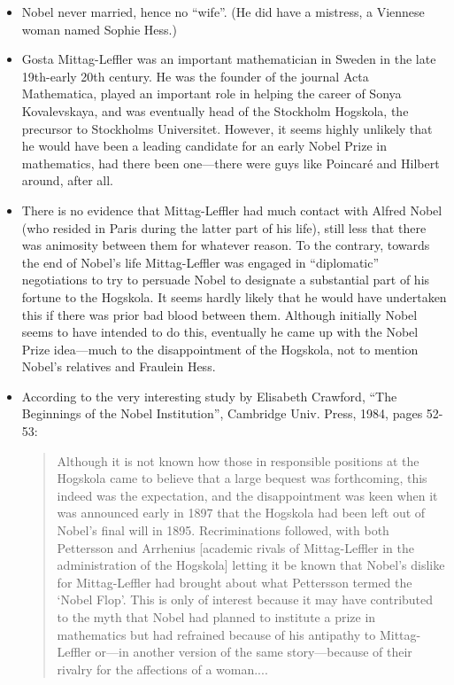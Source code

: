 \begin{itemize}
  \item Nobel never married, hence no ``wife''. (He did have a mistress,
  a Viennese woman named Sophie Hess.)

  \item Gosta Mittag-Leffler was an important mathematician in Sweden in
  the late 19th-early 20th century.  He was the founder of the journal
  Acta Mathematica, played an important role in helping the career of
  Sonya Kovalevskaya, and was eventually head of the Stockholm Hogskola,
  the precursor to Stockholms Universitet.  However, it seems highly
  unlikely that he would have been a leading candidate for an early
  Nobel Prize in mathematics, had there been one---there were guys like
  Poincar\'e and Hilbert around, after all.

  \item There is no evidence that Mittag-Leffler had much contact with
  Alfred Nobel (who resided in Paris during the latter part of his
  life), still less that there was animosity between them for whatever
  reason.  To the contrary, towards the end of Nobel's life
  Mittag-Leffler was engaged in ``diplomatic'' negotiations to try to
  persuade Nobel to designate a substantial part of his fortune to the
  Hogskola. It seems hardly likely that he would have undertaken this if
  there was prior bad blood between them.  Although initially Nobel
  seems to have intended to do this, eventually he came up with the
  Nobel Prize idea---much to the disappointment of the Hogskola, not to
  mention Nobel's relatives and Fraulein Hess.

  \item According to the very interesting study by Elisabeth Crawford,
  ``The Beginnings of the Nobel Institution'', Cambridge Univ. Press,
  1984, pages 52-53:
  \begin{quote}
    Although it is not known how those in responsible positions at the
    Hogskola came to believe that a large bequest was forthcoming, this
    indeed was the expectation, and the disappointment was keen when it
    was announced early in 1897 that the Hogskola had been left out of
    Nobel's final will in 1895.  Recriminations followed, with both
    Pettersson and Arrhenius [academic rivals of Mittag-Leffler in the
    administration of the Hogskola] letting it be known that Nobel's
    dislike for Mittag-Leffler had brought about what Pettersson termed
    the `Nobel Flop'.  This is only of interest because it may have
    contributed to the myth that Nobel had planned to institute a prize
    in mathematics but had refrained because of his antipathy to
    Mittag-Leffler or---in another version of the same story---because
    of their rivalry for the affections of a woman....
  \end{quote}


\end{itemize}
